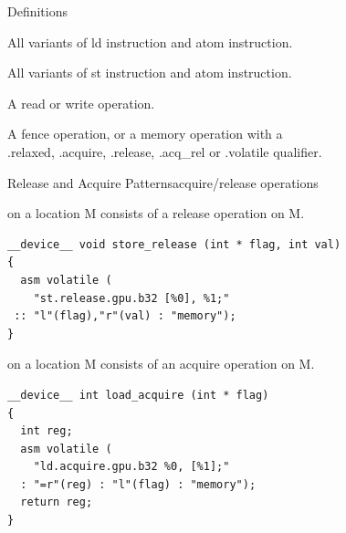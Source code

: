 \documentclass[aspectratio=169,compress]{beamer}
\begin{document}
\begin{frame}{Definitions}
  \begin{description}
  \item[Read operation]
    All variants of \textcolor{NordYellow}{ld} instruction and \textcolor{NordYellow}{atom} instruction.
  \item[Write operation]
    All variants of \textcolor{NordYellow}{st} instruction and \textcolor{NordYellow}{atom} instruction.
  \item[Memory operation]
    A \textcolor{NordYellow}{read} or \textcolor{NordYellow}{write} operation.
  \item[Strong operation]
		A \textcolor{NordYellow}{fence} operation, or a memory operation with a \\
			\textcolor{NordYellow}{.relaxed}, \textcolor{NordYellow}{.acquire}, 
			\textcolor{NordYellow}{.release}, \textcolor{NordYellow}{.acq\_rel} or 
			\textcolor{NordYellow}{.volatile} qualifier.
  \end{description}
\end{frame}

\begin{frame}[fragile]{Release and Acquire Patterns}{acquire/release operations}
  \begin{description}
		\item[Release pattern] on a location M consists of a release operation on M.

\begin{lstlisting}[]
__device__ void store_release (int * flag, int val) 
{
  asm volatile (
    "st.release.gpu.b32 [%0], %1;" 
 :: "l"(flag),"r"(val) : "memory"); 
}
\end{lstlisting}

		\item[Acquire pattern] on a location M consists of an acquire operation on M.

\begin{lstlisting}[]
__device__ int load_acquire (int * flag) 
{
  int reg;
  asm volatile (
    "ld.acquire.gpu.b32 %0, [%1];" 
  : "=r"(reg) : "l"(flag) : "memory"); 
  return reg;
}
\end{lstlisting}
	\end{description}

\end{frame}
\end{document}
